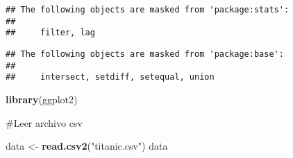 \documentclass[
]{article}
\newenvironment{Shaded}{\begin{snugshade}}{\end{snugshade}}
\newcommand{\FunctionTok}[1]{\textcolor[rgb]{0.13,0.29,0.53}{\textbf{#1}}}
\newcommand{\NormalTok}[1]{#1}
\newcommand{\OtherTok}[1]{\textcolor[rgb]{0.56,0.35,0.01}{#1}}
\newcommand{\StringTok}[1]{\textcolor[rgb]{0.31,0.60,0.02}{#1}}
\begin{document}
\begin{verbatim}
## The following objects are masked from 'package:stats':
## 
##     filter, lag
\end{verbatim}

\begin{verbatim}
## The following objects are masked from 'package:base':
## 
##     intersect, setdiff, setequal, union
\end{verbatim}

\begin{Shaded}
\begin{Highlighting}[]
\FunctionTok{library}\NormalTok{(ggplot2)}
\end{Highlighting}
\end{Shaded}

\#Leer archivo csv

\begin{Shaded}
\begin{Highlighting}[]
\NormalTok{data }\OtherTok{\textless{}{-}} \FunctionTok{read.csv2}\NormalTok{(}\StringTok{"titanic.csv"}\NormalTok{)}
\NormalTok{data}
\end{Highlighting}
\end{Shaded}
\end{document}
